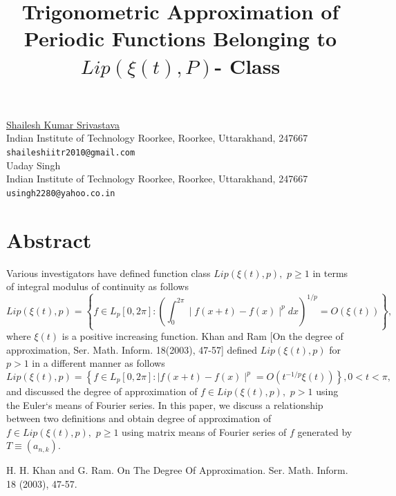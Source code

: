 \documentclass[article, A4, 11pt]{llncs}%
\begin{document}
\title{Trigonometric Approximation of Periodic Functions Belonging to $Lip(\xi(t), P)$- Class}
 \author{} \institute{}
\maketitle
\begin{center}
{\large \underline{Shailesh Kumar Srivastava}}\\
Indian Institute of Technology Roorkee, Roorkee, Uttarakhand, 247667\\
{\tt shaileshiitr2010@gmail.com}
\\ \vspace{4mm}
{\large Uaday Singh}\\
Indian Institute of Technology Roorkee, Roorkee, Uttarakhand, 247667\\
{\tt usingh2280@yahoo.co.in}
\end{center}

\section*{Abstract}
Various investigators have defined function class  $Lip(\xi(t), p),$ $p\geq1$ in terms of integral modulus of continuity as follows
\begin{equation}
Lip(\xi(t), p)=\left\{f\in L_{p}[0,2\pi]: \left(\int_{0}^{2\pi}\mid f(x+t)-f(x)\mid^{p}dx \right)^{1/p}= O(\xi(t))\right\},
\end{equation}
where $\xi(t)$ is a positive increasing function. Khan and Ram [On the degree of approximation, Ser. Math. Inform. 18(2003), 47-57] defined $Lip(\xi(t), p)$ for $p> 1$ in a different manner as follows
\begin{equation}
Lip(\xi(t), p)=\left\{f\in L_{p}[0,2\pi]: \mid f(x+t)-f(x)\mid^{p}= O(t^{-1/p}\xi(t))\right\}, 0 < t<\pi ,
\end{equation}
and discussed the degree of approximation of $f \in Lip(\xi(t), p),$ $p >1$ using the Euler`s means of Fourier series. In this paper, we discuss a relationship between two definitions and obtain degree of approximation of $f \in Lip(\xi(t), p),$ $p\geq 1$ using matrix means of Fourier series of $f$ generated by $T\equiv (a_{n,k}).$


\begin{thebibliography}{10}
{\sc H. H. Khan and G. Ram}. {On The Degree Of Approximation}. Ser. Math. Inform. 18 (2003), 47-57.
\end{thebibliography} %
\end{document}
